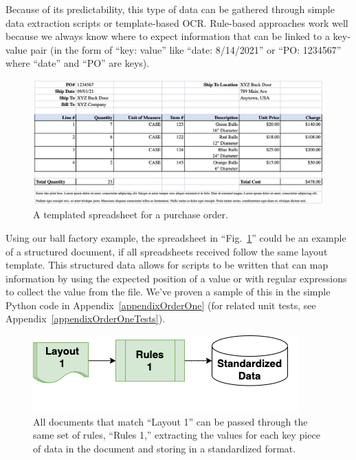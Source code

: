 \documentclass[conference]{IEEEtran}
\begin{document}
Because of its predictability, this type of data can be gathered through simple data extraction scripts or template-based OCR. Rule-based approaches work well because we always know where to expect information that can be linked to a key-value pair (in the form of ``key: value'' like ``date: 8/14/2021'' or ``PO: 1234567'' where ``date'' and ``PO'' are keys).

\begin{figure}[ht]
\centerline{\includegraphics[width=\columnwidth]{Spreadsheet1.png}}
\caption{A templated spreadsheet for a purchase order.}
\label{figSpreadsheet1}
\end{figure}

Using our ball factory example, the spreadsheet in ``Fig.~\ref{figSpreadsheet1}'' could be an example of a structured document, if all spreadsheets received follow the same layout template. This structured data allows for scripts to be written that can map information by using the expected position of a value or with regular expressions to collect the value from the file. We've proven a sample of this in the simple Python code in Appendix~\ref{appendixOrderOne} (for related unit tests, see Appendix~\ref{appendixOrderOneTests}).

\begin{figure}[ht]
\centerline{\includegraphics[width=\columnwidth]{RulesFlow1.png}}
\caption{All documents that match ``Layout 1'' can be passed through the same set of rules, ``Rules 1,'' extracting the values for each key piece of data in the document and storing in a standardized format.}
\label{figRulesFlow1}
\end{figure}
\end{document}
